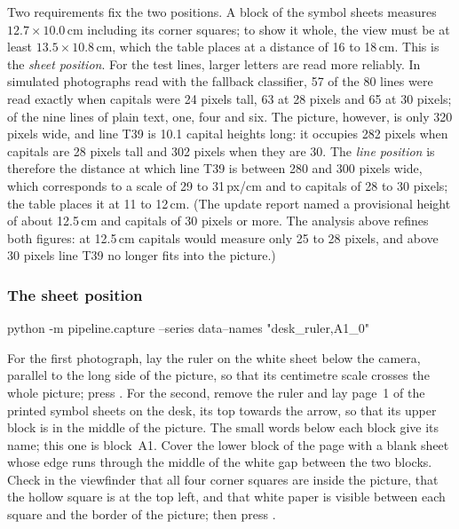 Two requirements fix the two positions. A block of the symbol sheets measures $12.7 \times
10.0$\,cm including its corner squares; to show it whole, the view must be at least
$13.5 \times 10.8$\,cm, which the table places at a distance of 16 to 18\,cm. This is the
\emph{sheet position}. For the test lines, larger letters are read more reliably. In simulated
photographs read with the fallback classifier, 57 of the 80 lines were read exactly when
capitals were 24 pixels tall, 63 at 28 pixels and 65 at 30 pixels; of the nine lines of plain
text, one, four and six. The picture, however, is only 320 pixels wide, and line T39 is 10.1
capital heights long: it occupies 282 pixels when capitals are 28 pixels tall and 302 pixels
when they are 30. The \emph{line position} is therefore the distance at which line T39 is
between 280 and 300 pixels wide, which corresponds to a scale of 29 to 31\,px/cm and to
capitals of 28 to 30 pixels; the table places it at 11 to 12\,cm. (The update report named a
provisional height of about 12.5\,cm and capitals of 30 pixels or more. The analysis above
refines both figures: at 12.5\,cm capitals would measure only 25 to 28 pixels, and above 30
pixels line T39 no longer fits into the picture.)

\subsubsection*{The sheet position}

\label{st:calsheet}
\begin{ps}
python -m pipeline.capture --series data\raw\rig --names "desk_ruler,A1_0"
\end{ps}
For the first photograph, lay the ruler on the white sheet below the camera, parallel to the
long side of the picture, so that its centimetre scale crosses the whole picture; press
. For the second, remove the ruler and lay page~1 of the printed symbol sheets on the
desk, its top towards the arrow, so that its upper block is in the middle of the picture. The
small words below each block give its name; this one is block~A1. Cover the lower block of the
page with a blank sheet whose edge runs through the middle of the white gap between the two
blocks. Check in the viewfinder that all four corner squares are inside the picture, that the
hollow square is at the top left, and that white paper is visible between each square and the
border of the picture; then press .

